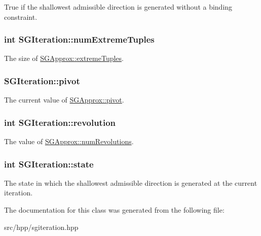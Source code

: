 True if the shallowest admissible direction is generated without a binding constraint. \hypertarget{classSGIteration_a14ecfb94b3111911d9b0ef545f72e88d}{
\subsubsection[{num\-Extreme\-Tuples}]{\setlength{\rightskip}{0pt plus 5cm}int S\-G\-Iteration\-::num\-Extreme\-Tuples}}\label{classSGIteration_a14ecfb94b3111911d9b0ef545f72e88d}
The size of \hyperlink{classSGApprox_ab0e2c4678401f806922ac64667ad5ff6}{S\-G\-Approx\-::extreme\-Tuples}. \hypertarget{classSGIteration_abdae7d336968af3515e7d9590cbcc46d}{
\subsubsection[{pivot}]{ S\-G\-Iteration\-::pivot}}\label{classSGIteration_abdae7d336968af3515e7d9590cbcc46d}
The current value of \hyperlink{classSGApprox_a037c73ff2b6ff8a55fadf57bb0a6a546}{S\-G\-Approx\-::pivot}. \hypertarget{classSGIteration_a21cc5c4fc7c40ff444ac7e3743c13940}{
\subsubsection[{revolution}]{\setlength{\rightskip}{0pt plus 5cm}int S\-G\-Iteration\-::revolution}}\label{classSGIteration_a21cc5c4fc7c40ff444ac7e3743c13940}
The value of \hyperlink{classSGApprox_a2bd0cab80a3f8d799fdc2841b65dd2c2}{S\-G\-Approx\-::num\-Revolutions}. \hypertarget{classSGIteration_a8f4cd9aa3ead30b86b081558f5a13147}{
\subsubsection[{state}]{\setlength{\rightskip}{0pt plus 5cm}int S\-G\-Iteration\-::state}}\label{classSGIteration_a8f4cd9aa3ead30b86b081558f5a13147}
The state in which the shallowest admissible direction is generated at the current iteration. 

The documentation for this class was generated from the following file\-:\begin{DoxyCompactItemize}
\item 
src/hpp/sgiteration.\-hpp\end{DoxyCompactItemize}
